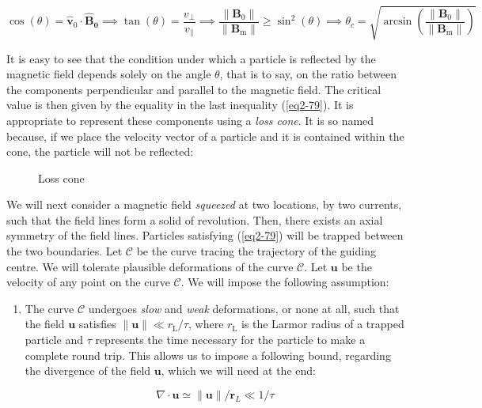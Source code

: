 \begin{equation}
    \label{eq2-79}
    \cos(\theta)=\mathbf{\hat{v}}_0\cdot\mathbf{\hat{B}_0}\implies\tan(\theta)=\frac{v_\perp}{v_\parallel}\implies\frac{\|\mathbf{B}_0\|}{\|\mathbf{B}_\text{m}\|}\geq\sin^2(\theta)\implies\theta_c=\sqrt{\arcsin\left(\frac{\|\mathbf{B}_0\|}{\|\mathbf{B}_\text{m}\|}\right)}
\end{equation}

It is easy to see that the condition under which a particle is reflected by the magnetic field depends solely on the angle $\theta$, that is to say, on the ratio between the components perpendicular and parallel to the magnetic field. The critical value is then given by the equality in the last inequality (\ref{eq2-79}). It is appropriate to represent these components using a \textit{loss cone}. It is so named because, if we place the velocity vector of a particle and it is contained within the cone, the particle will not be reflected:

\begin{figure}[H]
    \centering
    \scalebox{1}{}
    \caption{\centering Loss cone}
    \label{fig2-1}
\end{figure}

We will next consider a magnetic field \textit{squeezed} at two locations, by two currents, such that the field lines form a solid of revolution. Then, there exists an axial symmetry of the field lines. Particles satisfying (\ref{eq2-79}) will be trapped between the two boundaries. Let $\mathcal{C}$ be the curve tracing the trajectory of the guiding centre. We will tolerate plausible deformations of the curve $\mathcal{C}$. Let $\mathbf{u}$ be the velocity of any point on the curve $\mathcal{C}$. We will impose the following assumption:

\begin{enumerate}
    \item The curve $\mathcal{C}$ undergoes \textit{slow} and \textit{weak} deformations, or none at all, such that the field $\mathbf{u}$ satisfies $\|\mathbf{u}\|\ll r_\text{L}/\tau$, where $r_\text{L}$ is the Larmor radius of a trapped particle and $\tau$ represents the time necessary for the particle to make a complete round trip. This allows us to impose a following bound, regarding the divergence of the field $\mathbf{u}$, which we will need at the end:
    
    \begin{equation}
        \nabla\cdot\mathbf{u}\simeq\|\mathbf{u}\|/\mathbf{r}_L\ll1/\tau
    \end{equation}
\end{enumerate}

